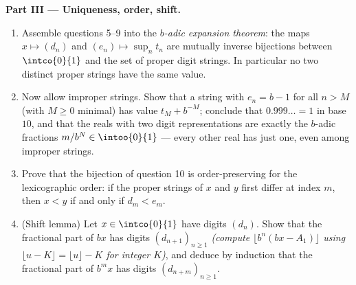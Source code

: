 \begin{problem}
\medskip
\noindent\textbf{Part III --- Uniqueness, order, shift.}
\begin{enumerate}[resume]
  \item Assemble questions 5--9 into the \emph{$b$-adic expansion
        theorem}: the maps $x \mapsto (d_n)$ and $(e_n) \mapsto
        \sup_n t_n$ are mutually inverse bijections between
        $\intco{0}{1}$ and the set of proper digit strings. In
        particular no two distinct proper strings have the same
        value.
  \item Now allow improper strings. Show that a string with $e_n
        = b - 1$ for all $n > M$ (with $M \geq 0$ minimal) has
        value $t_M + b^{-M}$; conclude that $0.999\dots = 1$ in
        base $10$, and that the reals with two digit
        representations are exactly the $b$-adic fractions
        $m/b^N \in \intoo{0}{1}$ --- every other real has just
        one, even among improper strings.
  \item Prove that the bijection of question 10 is
        order-preserving for the lexicographic order: if the
        proper strings of $x$ and $y$ first differ at index $m$,
        then $x < y$ if and only if $d_m < e_m$.
  \item (Shift lemma) Let $x \in \intco{0}{1}$ have digits
        $(d_n)$. Show that the fractional part of $bx$ has digits
        $(d_{n+1})_{n \geq 1}$ \emph{(compute $\lfloor b^n(bx -
        A_1)\rfloor$ using $\lfloor u - K \rfloor = \lfloor u
        \rfloor - K$ for integer $K$)}, and deduce by induction
        that the fractional part of $b^m x$ has digits
        $(d_{n+m})_{n \geq 1}$.
\end{enumerate}


\end{problem}
